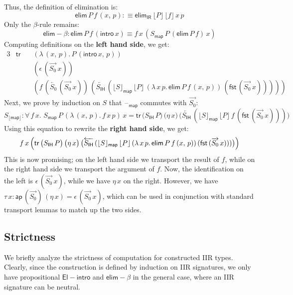 \documentclass[acmsmall,screen,review,anonymous]{acmart}
\newcommand{\msf}[1]{{\mathsf{#1}}}
\newcommand{\blank}{{\mathord{\hspace{1pt}\text{--}\hspace{1pt}}}}
\newcommand{\IR}{\msf{IR}}
\newcommand{\intro}{\msf{intro}}
\newcommand{\IH}{\msf{IH}}
\newcommand{\map}{\msf{map}}
\newcommand{\elim}{\msf{elim}}
\newcommand{\tr}{\msf{tr}}
\newcommand{\fst}{\msf{fst}}
\newcommand{\floord}[1]{\lfloor #1 \rfloor}
\newcommand{\ora}[1]{\overrightarrow{#1}}
\newcommand{\ola}[1]{\overleftarrow{#1}}
\newcommand{\ap}{\msf{ap}}
\begin{document}
Thus, the definition of elimination is:
\[ \elim\,P\,f\,(x,\,p) :\equiv \elim_\IR\,\floord{P}\,\floord{f}\,x\,p \]
Only the $\beta$-rule remains:
\[ \elim\!-\!\!\beta : \elim\,P\,f\,(\intro\,x) \equiv f\,x\,(S_\map\,P\,(\elim\,P\,f)\,x) \]
Computing definitions on the \textbf{left hand side}, we get:
\begin{alignat*}{3}
  & \tr\, &&(\lambda\,(x,\,p).\,P\,(\intro\,x,\,p))\\
  &       &&(\epsilon\,(\ora{S_0}\,x))\\
  &       &&(f\,(\ola{S_0}\,(\ora{S_0}\,x))\,(\ola{S_\IH}\,(\floord{S}_\map\,\floord{P}\,(\lambda\,x\,p.\,\elim\,P\,f\,(x,\,p))\,(\fst\,(\ora{S_0}\,x)))))
\end{alignat*}
Next, we prove by induction on $S$ that $\blank_\map$ commutes with $\ora{S_0}$:
\[ S_{\floord{\map}} : \forall\,f\,x.\,\,S_\map\,P\,(\lambda\,(x,\,p).\,f\,x\,p)\,x = \tr\,\bigl(S_\IH\,P\bigr)\,\bigl(\eta\,x\bigr)\,\bigl(\ola{S_\IH}\,(\floord{S}_\map\,\floord{P}\,f\,(\fst\,(\ora{S_0}\,x)))\bigr)\]
Using this equation to rewrite the \textbf{right hand side}, we get:
\begin{alignat*}{3}
  f\,x\,\Bigl(\tr\,\bigl(S_\IH\,P\bigr)\,\bigl(\eta\,x\bigr)\,\bigl(\ola{S_\IH}\,(\floord{S}_\map\,\floord{P}\,(\lambda\,x\,p.\,\elim\,P\,f\,(x,\,p))\,(\fst\,(\ora{S_0}\,x)))\bigr)\Bigr)
\end{alignat*}
This is now promising; on the left hand side we transport the result of $f$, while on the right hand
side we transport the argument of $f$. Now, the identification on the left is
$\epsilon\,(\ora{S_0}\,x)$, while we have $\eta\,x$ on the right. However, we have $\tau\,x :
\ap\,(\ora{S_0})\,(\eta\,x) = \epsilon\,(\ora{S_0}\,x)$, which can be used in conjunction with
standard transport lemmas to match up the two sides.

\subsection{Strictness}
We briefly analyze the strictness of computation for constructed IIR types. Clearly, since the
construction is defined by induction on IIR signatures, we only have propositional
$\msf{El\!\!-\!\!intro}$ and $\elim\!-\!\!\beta$ in the general case, where an IIR signature can be
neutral.
\end{document}

